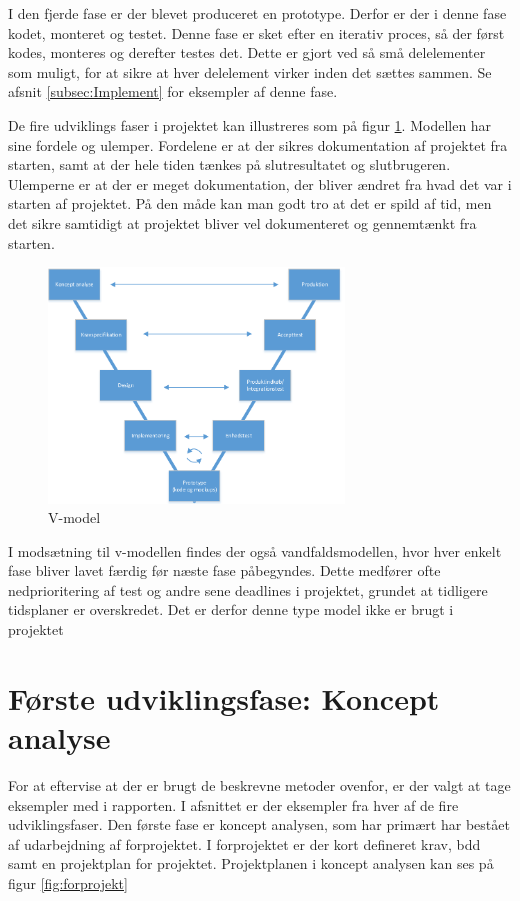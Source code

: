 I den fjerde fase er der blevet produceret en prototype. Derfor er der i denne fase kodet, monteret og testet. Denne fase er sket efter en iterativ proces, så der først kodes, monteres og derefter testes det. Dette er gjort ved så små delelementer som muligt, for at sikre at hver delelement virker inden det sættes sammen. Se afsnit \ref{subsec:Implement} for eksempler af denne fase. 

De fire udviklings faser i projektet kan illustreres som på figur \ref{fig:v-model}. Modellen har sine fordele og ulemper. Fordelene er at der sikres dokumentation af projektet fra starten, samt at der hele tiden tænkes på slutresultatet og slutbrugeren. Ulemperne er at der er meget dokumentation, der bliver ændret fra hvad det var i starten af projektet. På den måde kan man godt tro at det er spild af tid, men det sikre samtidigt at projektet bliver vel dokumenteret og gennemtænkt fra starten.

\begin{figure}[H]
	\centering
	\includegraphics[width=0.7\textwidth]{billeder/Hovedrapport/V-model.PDF}
	\caption{V-model}
	\label{fig:v-model}
\end{figure}

I modsætning til v-modellen findes der også vandfaldsmodellen, hvor hver enkelt fase bliver lavet færdig før næste fase påbegyndes. Dette medfører ofte nedprioritering af test og andre sene deadlines i projektet, grundet at tidligere tidsplaner er overskredet. Det er derfor denne type model ikke er brugt i projektet
\newpage

\section{Første udviklingsfase: Koncept analyse}
For at eftervise at der er brugt de beskrevne metoder ovenfor, er der valgt at tage eksempler med i rapporten. I afsnittet er der eksempler fra hver af de fire udviklingsfaser. Den første fase er koncept analysen, som har primært har bestået af udarbejdning af forprojektet. I forprojektet er der kort defineret krav, bdd samt en projektplan for projektet. Projektplanen i koncept analysen kan ses på figur \ref{fig:forprojekt}


